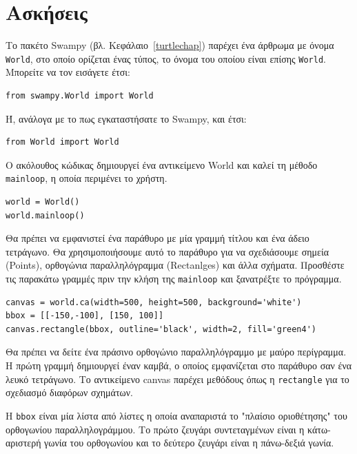 \documentclass[10pt]{book}
\begin{document}
\section{Ασκήσεις}

\begin{exercise}
\label{canvas} 

Το πακέτο Swampy (βλ. Κεφάλαιο~\ref{turtlechap}) παρέχει ένα άρθρωμα με όνομα {\tt World},
στο οποίο ορίζεται ένας τύπος, το όνομα του οποίου είναι επίσης {\tt World}.
Μπορείτε να τον εισάγετε έτσι:

\begin{verbatim}
from swampy.World import World
\end{verbatim}

Ή, ανάλογα με το πως εγκαταστήσατε το Swampy, και έτσι:

\begin{verbatim}
from World import World
\end{verbatim}

Ο ακόλουθος κώδικας δημιουργεί ένα αντικείμενο World και καλεί τη μέθοδο
{\tt mainloop}, η οποία περιμένει το χρήστη. 

\begin{verbatim}
world = World()
world.mainloop()
\end{verbatim}

Θα πρέπει να εμφανιστεί ένα παράθυρο με μία γραμμή τίτλου και ένα άδειο τετράγωνο.
Θα χρησιμοποιήσουμε αυτό το παράθυρο για να σχεδιάσουμε σημεία (Points), ορθογώνια
παραλληλόγραμμα (Rectanlges) και άλλα σχήματα. Προσθέστε τις παρακάτω γραμμές πριν την κλήση
της \verb"mainloop" και ξανατρέξτε το πρόγραμμα. 

\begin{verbatim}
canvas = world.ca(width=500, height=500, background='white')
bbox = [[-150,-100], [150, 100]]
canvas.rectangle(bbox, outline='black', width=2, fill='green4')
\end{verbatim}

Θα πρέπει να δείτε ένα πράσινο ορθογώνιο παραλληλόγραμμο με μαύρο περίγραμμα.
Η πρώτη γραμμή δημιουργεί έναν καμβά, ο οποίος εμφανίζεται στο παράθυρο σαν ένα λευκό τετράγωνο.
Το αντικείμενο canvas παρέχει μεθόδους όπως η {\tt rectangle} για το σχεδιασμό διαφόρων σχημάτων.

Η {\tt bbox} είναι μία λίστα από λίστες η οποία αναπαριστά το  "πλαίσιο οριοθέτησης" του
ορθογωνίου παραλληλογράμμου. Το πρώτο ζευγάρι συντεταγμένων είναι η κάτω-αριστερή γωνία του
ορθογωνίου και το δεύτερο ζευγάρι είναι η πάνω-δεξιά γωνία.


\end{exercise}
\end{document}
